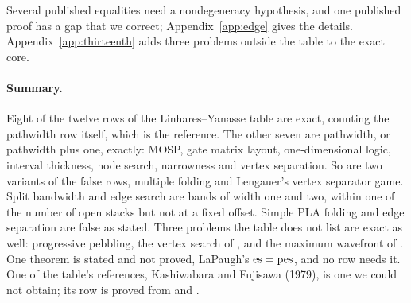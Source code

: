 Several published equalities need a nondegeneracy hypothesis, and one published proof has a gap that we correct; Appendix~\ref{app:edge} gives the details.
Appendix~\ref{app:thirteenth} adds three problems outside the table to the
exact core.

\paragraph{Summary.} Eight of the twelve rows of the Linhares--Yanasse table
are exact, counting the pathwidth row itself, which is the reference. The other
seven are pathwidth, or pathwidth plus one, exactly: MOSP, gate matrix layout,
one-dimensional logic, interval thickness, node search, narrowness and vertex
separation. So are two variants of the false rows, multiple folding and
Lengauer's vertex separator game. Split bandwidth and edge search are bands of
width one and two, within one of the number of open stacks but not at a fixed
offset. Simple PLA folding and edge separation are false as stated. Three
problems the table does not list are exact as well: progressive pebbling, the
vertex search of \citet{BRST1991}, and the maximum wavefront of
\citet{KumfertPothen1997}. One theorem is stated and not proved, LaPaugh's
$\mathrm{es}=\mathrm{pes}$, and no row needs it.
One of the table's references, Kashiwabara and Fujisawa (1979), is one we could not obtain; its
row is proved from \citet{LY2002ref6} and \citet{LY2002ref9}.
